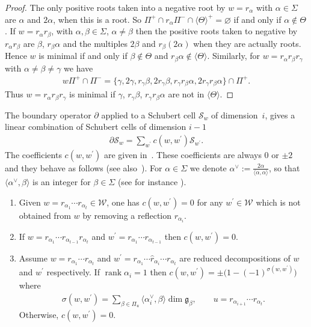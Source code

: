 \documentclass[pdftex]{sigma}
\numberwithin{equation}{section}
\begin{document}
\begin{proof}The only positive roots taken into a negative root by $w=r_{\alpha }$ with $\alpha \in \Sigma $ are $\alpha $ and $2\alpha $, when this is a root. So $\Pi ^{+}\cap r_{\alpha }\Pi ^{-}\cap \langle\Theta\rangle^{+}=\varnothing $ if and only if $\alpha \notin \Theta $. If $w=r_{\alpha }r_{\beta }$, with $\alpha,\beta \in \Sigma $, $\alpha \neq
\beta $ then the positive roots taken to negative by $r_{\alpha }r_{\beta }$ are $\beta $, $r_{\beta }\alpha $ and the multiples $2\beta $ and $r_{\beta}(2\alpha )$ when they are actually roots. Hence $w$ is minimal if and only if $\beta \notin \Theta $ and $r_{\beta }\alpha \notin \langle\Theta\rangle $. Similarly, for $w=r_{\alpha}r_{\beta }r_{\gamma }$ with $\alpha \neq \beta \neq \gamma $ we have
\begin{gather*}
w\Pi ^{+}\cap \Pi ^{-}=\{\gamma,2\gamma,r_{\gamma }\beta,2r_{\gamma}\beta,r_{\gamma }r_{\beta }\alpha,2r_{\gamma }r_{\beta }\alpha \}\cap \Pi ^{+}.
\end{gather*}
Thus $w=r_{\alpha }r_{\beta }r_{\gamma }$ is minimal if $\gamma$, $r_{\gamma}\beta$, $r_{\gamma }r_{\beta }\alpha $ are not in $\langle\Theta\rangle $.
\end{proof}

The boundary operator $\partial $ applied to a Schubert cell $\mathcal{S}_{w} $ of dimension~$i$, gives a linear combination of Schubert cells of dimension $i-1$
\begin{gather}
\partial \mathcal{S}_{w}=\sum_{w^{\prime }}c(w,w^{\prime })\mathcal{S}_{w^{\prime }}. \label{eq.boundcoeff}
\end{gather}
The coefficients $c(w,w^{\prime })$ are given in~\cite[Section~2]{RSM}. These coefficients are always $0$ or $\pm 2$ and they behave as follows (see also~\cite{SR}). For $\alpha\in \Sigma$ we denote $\alpha ^{\vee }:=\frac{2\alpha }{ \langle \alpha,\alpha \rangle }$, so that $ \langle \alpha ^{\vee },\beta \rangle $ is an integer for $\beta \in \Sigma$ (see for instance \cite{He}).
\begin{enumerate}\itemsep=0pt
\item \label{onlysupr}Given $w=r_{\alpha _{1}}\cdots r_{\alpha _{t}}\in \mathcal{W}$, one has $c(w,w^{\prime })=0$ for any $w^{\prime }\in \mathcal{W}$ which is not obtained from $w$ by removing a reflection $r_{\alpha _{i}}$.
\item \label{suprult}If $w=r_{\alpha _{1}}\cdots r_{\alpha _{t-1}}r_{\alpha_{t}}$ and $w^{\prime }=r_{\alpha _{1}}\cdots r_{\alpha _{t-1}}$ then $c(w,w^{\prime })=0$.
\item Assume $w=r_{\alpha _{1}}\cdots r_{\alpha _{t}}$ and $w^{\prime}=r_{\alpha _{1}}\cdots \widehat{r}_{\alpha _{i}}\cdots r_{\alpha _{t}}$ are reduced decompositions of $w$ and $w^{\prime }$ respectively. If $\operatorname{rank} \alpha _{i}=1$ then $c(w,w^{\prime })=\pm \big(1-(-1) ^{\sigma ( w,w^{\prime }) }\big) $ where
\begin{gather}
\sigma (w,w^{\prime}) =\sum_{\beta \in \Pi _{u}}\langle \alpha _{i}^\vee,\beta \rangle \dim \mathfrak{g}_{\beta },\qquad u=r_{\alpha _{i+1}}\cdots r_{\alpha_{t}}. \label{forsigmasoma}
\end{gather}%
Otherwise, $c(w,w^{\prime })=0$.
\end{enumerate}
\end{document}
